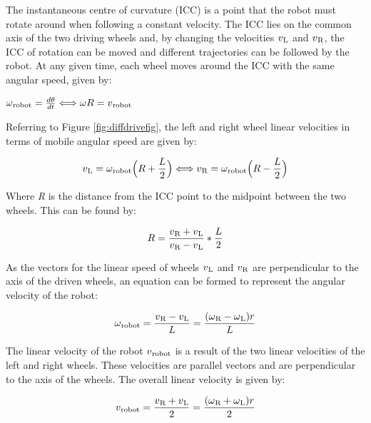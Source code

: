The instantaneous centre of curvature (ICC) is a point that the robot must rotate around when following a constant velocity. The ICC lies on the common axis of the two driving wheels and, by changing the velocities $v\textsubscript{L}$ and $v\textsubscript{R}$, the ICC of rotation can be moved and different trajectories can be followed by the robot. At any given time, each wheel moves around the ICC with the same angular speed, given by:

\begin{center}
$\omega\textsubscript{robot} = \frac{d\theta}{dt} \Longleftrightarrow \omega R = v\textsubscript{robot}$
\end{center}

Referring to Figure \ref{fig:diffdrivefig}, the left and right wheel linear velocities in terms of mobile angular speed are given by:

\begin{equation}\label{xyvelocities}
    v\textsubscript{L} = \omega\textsubscript{robot} \Big(R + \frac{L}{2}\Big) \Longleftrightarrow v\textsubscript{R} = \omega\textsubscript{robot} \Big(R - \frac{L}{2}\Big)
\end{equation}

Where \textit{R} is the distance from the ICC point to the midpoint between the two wheels. This can be found by:

\begin{equation}
    R = \frac{v\textsubscript{R}+v\textsubscript{L}}{v\textsubscript{R}-v\textsubscript{L}}*\frac{L}{2}    
\end{equation}

As the vectors for the linear speed of wheels $v\textsubscript{L}$ and $v\textsubscript{R}$ are perpendicular to the axis of the driven wheels, an equation can be formed to represent the angular velocity of the robot:

\begin{equation}\label{omegarobot}
    \omega\textsubscript{robot} = \frac{v\textsubscript{R}-v\textsubscript{L}}{L} = \frac{(\omega\textsubscript{R}-\omega\textsubscript{L})r}{L}
\end{equation}

The linear velocity of the robot $v\textsubscript{robot}$ is a result of the two linear velocities of the left and right wheels. These velocities are parallel vectors and are perpendicular to the axis of the wheels. The overall linear velocity is given by:

\begin{equation}\label{vrobot}
    v\textsubscript{robot} = \frac{v\textsubscript{R} + v\textsubscript{L}}{2} = \frac{(\omega\textsubscript{R}+\omega\textsubscript{L})r}{2}
\end{equation}

